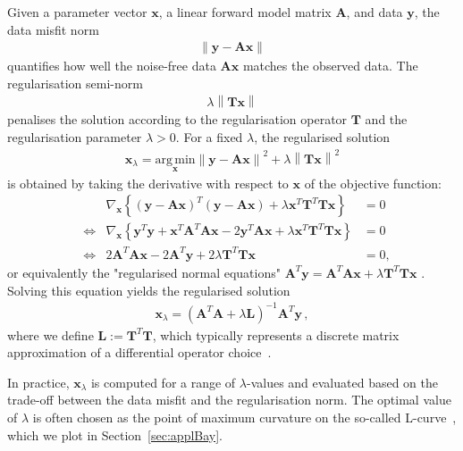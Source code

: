 Given a parameter vector $\bm{x}$, a linear forward model matrix $\bm{A}$, and data $\bm{y}$, the data misfit norm
\begin{align}
	\left\lVert \bm{y} - \bm{A} \bm{x} \right\rVert
\end{align}
quantifies how well the noise-free data  $\bm{A}\bm{x}$ matches the observed data.
The regularisation semi-norm
\begin{align}
	\lambda \left\lVert \bm{T} \bm{x} \right\rVert
\end{align}
penalises the solution according to the regularisation operator $\bm{T}$ and the regularisation parameter $\lambda > 0$.
For a fixed $\lambda$, the regularised solution
\begin{align}
	\bm{x}_{\lambda} = \underset{\bm{x}}{\mathrm{arg\,min}} \left\lVert \bm{y} - \bm{A} \bm{x} \right\rVert^2 + \lambda \left\lVert \bm{T} \bm{x} \right\rVert^2
\end{align}
is obtained by taking the derivative with respect to $\bm{x}$ of the objective function:
\begin{align}
	& & \nabla_{\bm{x}} \left\{ (\bm{y} - \bm{A} \bm{x})^T (\bm{y} - \bm{A} \bm{x}) + \lambda \bm{x}^T \bm{T}^T \bm{T} \bm{x} \right\} &= 0 \\
	&\iff & \nabla_{\bm{x}} \left\{ \bm{y}^T \bm{y} + \bm{x}^T \bm{A}^T \bm{A} \bm{x} - 2 \bm{y}^T \bm{A} \bm{x} + \lambda \bm{x}^T \bm{T}^T \bm{T} \bm{x} \right\} &= 0 \\
	&\iff & 2 \bm{A}^T \bm{A} \bm{x} - 2 \bm{A}^T \bm{y} + 2 \lambda \bm{T}^T \bm{T} \bm{x} &= 0,
\end{align}
or equivalently the "regularised normal equations" $\bm{A}^T \bm{y} = \bm{A}^T \bm{A} \bm{x} + \lambda \bm{T}^T \bm{T} \bm{x}$ \cite{Hansen2001LCurve}.
Solving this equation yields the regularised solution
\begin{align}
	\bm{x}_{\lambda} = (\bm{A}^T \bm{A} + \lambda \bm{L})^{-1} \bm{A}^T \bm{y} \, , \label{eq:regSol}
\end{align}
where we define $\bm{L} := \bm{T}^T \bm{T}$, which typically represents a discrete matrix approximation of a differential operator choice~\cite{tan2016LecNot}.

In practice, $\bm{x}_{\lambda}$ is computed for a range of $\lambda$-values and evaluated based on the trade-off between the data misfit and the regularisation norm. The optimal value of $\lambda$ is often chosen as the point of maximum curvature on the so-called L-curve~\cite{hansen1993use}, which we plot in Section~\ref{sec:applBay}.



